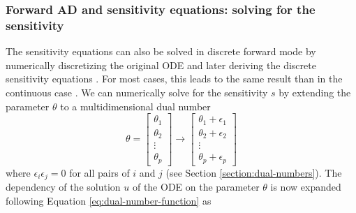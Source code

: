 
\subsubsection{Forward AD and sensitivity equations: solving for the sensitivity}

The sensitivity equations can also be solved in discrete forward mode by numerically discretizing the original ODE and later deriving the discrete sensitivity equations \cite{ma2021comparison}. 
For most cases, this leads to the same result than in the continuous case \cite{FATODE2014}.
We can numerically solve for the sensitivity $s$ by extending the parameter $\theta$ to a multidimensional dual number %
\begin{equation}
    \theta =
    \begin{bmatrix}
    \theta_1 \\
    \theta_2 \\
    \vdots \\
    \theta_p
    \end{bmatrix}
    \rightarrow
    \begin{bmatrix}
    \theta_1 + \epsilon_1 \\
    \theta_2 + \epsilon_2 \\
    \vdots \\
    \theta_p + \epsilon_p
    \end{bmatrix}
\end{equation}
where $\epsilon_i \epsilon_j = 0$ for all pairs of $i$ and $j$ (see Section \ref{section:dual-numbers}). 
The dependency of the solution $u$ of the ODE on the parameter $\theta$ is now expanded following Equation \eqref{eq:dual-number-function} as 
